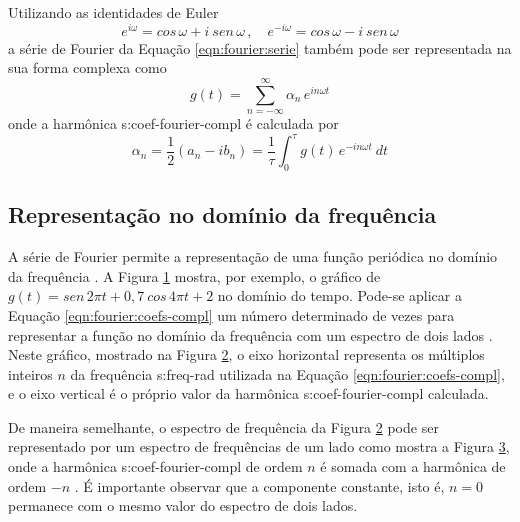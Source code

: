 \documentclass[12pt,openright,oneside,a4paper,
	chapter=TITLE,section=TITLE,
	english,brazil]{abntex2}
\begin{document}
	Utilizando as identidades de Euler
	\begin{equation}\label{eqn:fourier:ident-euler}
		e^{i\omega} = cos\,\omega + i\ sen\,\omega\, , \quad e^{-i\omega} = cos\,\omega - i\ sen\,\omega
	\end{equation}
	a série de Fourier da Equação \ref{eqn:fourier:serie} também pode ser representada na sua forma complexa como \cite{spiegel:1977}
	\begin{equation}\label{eqn:fourier:serie-compl}
		g(t) = \sum_{n=-\infty}^{\infty}\alpha_n\,e^{in\omega t}
	\end{equation}
	onde a harmônica \gls{s:coef-fourier-compl} é calculada por \cite{dimarogonas:1995}
	\begin{equation}\label{eqn:fourier:coefs-compl}
		\alpha_n = \frac{1}{2}(a_n - ib_n) = \frac{1}{\tau}\int_{0}^{\tau}g(t)\,e^{-in\omega t}\ dt
	\end{equation}
	
	\subsection{Representação no domínio da frequência} \label{sec:espectros-frequencia}
	A série de Fourier permite a representação de uma função periódica no domínio da frequência \cite{rao:2008}. A Figura \ref{fig:funcao-periodica} mostra, por exemplo, o gráfico de $ g(t) = sen\,2\pi t + 0,\!7\:cos\,4\pi t + 2 $ no domínio do tempo. Pode-se aplicar a Equação \ref{eqn:fourier:coefs-compl} um número determinado de vezes para representar a função no domínio da frequência com um espectro de dois lados \cite{dimarogonas:1995}. Neste gráfico, mostrado na Figura \ref{fig:espectro-2sided}, o eixo horizontal representa os múltiplos inteiros $ n $ da frequência \gls{s:freq-rad} utilizada na Equação \ref{eqn:fourier:coefs-compl}, e o eixo vertical é o próprio valor da harmônica \gls{s:coef-fourier-compl} calculada.
	\begin{figure}[b]
		\label{fig:funcao-periodica}
	\end{figure}
	\begin{figure}[t]
		\label{fig:espectro-2sided}
	\end{figure}
	
	De maneira semelhante, o espectro de frequência da Figura \ref{fig:espectro-2sided} pode ser representado por um espectro de frequências de um lado como mostra a Figura \ref{fig:espectro-1sided}, onde a harmônica \gls{s:coef-fourier-compl} de ordem $ n $ é somada com a harmônica de ordem $ -n $ \cite{randall:1987}. É importante observar que a componente constante, isto é, $ n=0 $ permanece com o mesmo valor do espectro de dois lados.
	\begin{figure}[t]
		\label{fig:espectro-1sided}
	\end{figure}
	
\end{document}
